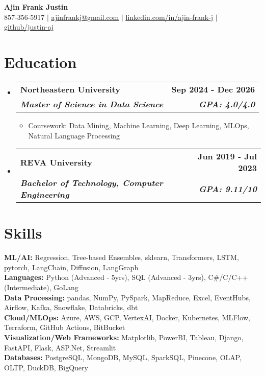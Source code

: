 \documentclass[letterpaper,11pt]{article}
\makeatletter
\newcommand{\resumeItem}[1]{
  \item\small{
    {#1 \vspace{-2pt}}
  }
}
\newcommand{\resumeSubheading}[4]{
  \vspace{-2pt}\item
    \begin{tabular*}{0.97\textwidth}[t]{l@{\extracolsep{\fill}}r}
      \textbf{#1} & #2 \\
      \textit{\small#3} & \textit{\small #4} \\
    \end{tabular*}\vspace{-7pt}
}
\newcommand{\resumeSubHeadingListStart}{\begin{itemize}[leftmargin=0.15in, label={}]}
\newcommand{\resumeSubHeadingListEnd}{\end{itemize}}
\newcommand{\resumeItemListStart}{\begin{itemize}}
\newcommand{\resumeItemListEnd}{\end{itemize}\vspace{-5pt}}
\makeatother
\begin{document}
\begin{center}
    \textbf{\Huge Ajin Frank Justin} \\
    \vspace{1pt}
    857-356-5917 $|$ 
    \href{mailto:ajinfrankj@gmail.com}{\underline{ajinfrankj@gmail.com}} $|$ 
    \href{https://www.linkedin.com/in/ajin-frank-j/}{\underline{linkedin.com/in/ajin-frank-j}} $|$ 
    \href{https://github.com/justin-aj}{\underline{github/justin-aj}} 
    
\end{center}

\vspace{-15pt}  %

\section{Education}
\resumeSubHeadingListStart
\resumeSubheading
{Northeastern University}{\textbf{Sep 2024 - Dec 2026}}
{\normalfont \textbf{Master of Science in Data Science}}
{\normalfont \textbf{GPA: 4.0/4.0}}
\resumeItemListStart
    \resumeItem{Coursework: Data Mining, Machine Learning, Deep Learning, MLOps, Natural Language Processing}
\resumeItemListEnd

\vspace{-1pt}  %

\resumeSubheading
{REVA University}{\textbf{Jun 2019 - Jul 2023}}
{\normalfont \textbf{Bachelor of Technology, Computer Engineering}}{\normalfont \textbf{GPA: 9.11/10}}
\resumeSubHeadingListEnd

\vspace{-10pt}  %

\section{Skills}
 \begin{itemize}[leftmargin=0.05in, label={}]
    \small{\item{
\textbf{ML/AI:} {Regression, Tree-based Ensembles, sklearn, Transformers, LSTM, pytorch, LangChain, Diffusion, LangGraph} \\
    \textbf{Languages:} {Python (Advanced - 5yrs), SQL (Advanced - 3yrs), C\#/C/C++ (Intermediate), GoLang} \\
    \textbf{Data Processing:} {pandas, NumPy, PySpark, MapReduce, Excel, EventHubs, Airflow, Kafka, Snowflake, Databricks, dbt} \\
    \textbf{Cloud/MLOps:} {Azure, AWS, GCP, VertexAI, Docker, Kubernetes, MLFlow, Terraform, GitHub Actions, BitBucket} \\
    \textbf{Visualization/Web Frameworks:} {Matplotlib, PowerBI, Tableau, Django, FastAPI, Flask, ASP.Net, Streamlit} \\
    \textbf{Databases:} {PostgreSQL, MongoDB, MySQL, SparkSQL, Pinecone, OLAP, OLTP, DuckDB, BigQuery}}}
\end{itemize}
\end{document}
